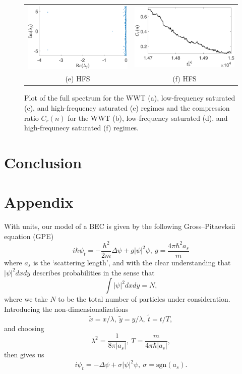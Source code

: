 \documentclass[a4paper,11pt]{article}
\begin{document}
\begin{figure}[!ht]
\begin{tabular}{cc}
\includegraphics[width=.525\textwidth]{full_spec_hf_K_128_Lx_128_tf_1_pt5e4} &\hspace{-25pt} \includegraphics[width=.525\textwidth]{cratio_hfforce_K_128_Lx_128_tf_1pt5e4}\\
(e) HFS & (f) HFS
\end{tabular}
\caption{Plot of the full spectrum for the WWT (a), low-frequency saturated (c), and high-frequency saturated (e) regimes and the compression ratio $C_{r}(n)$ for the WWT (b), low-frequency saturated (d), and high-frequnecy saturated (f) regimes.}
\label{fig:comprats}
\end{figure}

\section*{Conclusion}

\section*{Appendix}
With units, our model of a BEC is given by the following Gross--Pitaevksii equation (GPE)
\[
i\hbar\psi_{t} = -\frac{\hbar^{2}}{2m}\Delta \psi + g\left| \psi\right|^{2}\psi, ~ g = \frac{4\pi \hbar^{2}a_{s}}{m}
\]
where $a_{s}$ is the `scattering length', and with the clear understanding that $\left|\psi\right|^{2}dxdy$ describes probabilities in the sense that 
\[
\int |\psi|^{2}dxdy = N,
\]
where we take $N$ to be the total number of particles under consideration.  Introducing the non-dimensionalizations 
\[
\tilde{x} = x/\lambda, ~ \tilde{y} = y/\lambda, ~ \tilde{t} = t/T, 
\]
and choosing
\[
\lambda^{2} = \frac{1}{8\pi |a_{s}|}, ~ T = \frac{m}{4\pi\hbar |a_{s}|}, 
\] 
then gives us
\[
i\psi_{t} = -\Delta \psi + \sigma\left| \psi\right|^{2}\psi,  ~\sigma = \mbox{sgn}(a_{s}).
\]



\end{document}
